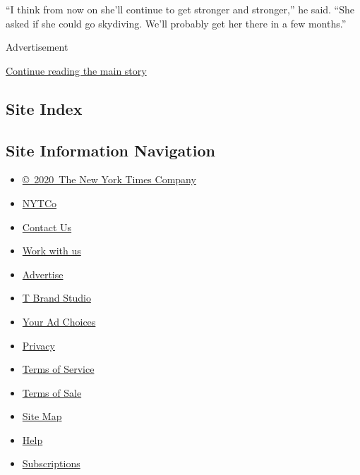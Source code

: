 ``I think from now on she'll continue to get stronger and stronger,'' he
said. ``She asked if she could go skydiving. We'll probably get her
there in a few months.''

Advertisement

\protect\hyperlink{after-bottom}{Continue reading the main story}

\hypertarget{site-index}{%
\subsection{Site Index}\label{site-index}}

\hypertarget{site-information-navigation}{%
\subsection{Site Information
Navigation}\label{site-information-navigation}}

\begin{itemize}
\tightlist
\item
  \href{https://help.nytimes3xbfgragh.onion/hc/en-us/articles/115014792127-Copyright-notice}{©~2020~The
  New York Times Company}
\end{itemize}

\begin{itemize}
\tightlist
\item
  \href{https://www.nytco.com/}{NYTCo}
\item
  \href{https://help.nytimes3xbfgragh.onion/hc/en-us/articles/115015385887-Contact-Us}{Contact
  Us}
\item
  \href{https://www.nytco.com/careers/}{Work with us}
\item
  \href{https://nytmediakit.com/}{Advertise}
\item
  \href{http://www.tbrandstudio.com/}{T Brand Studio}
\item
  \href{https://www.nytimes3xbfgragh.onion/privacy/cookie-policy\#how-do-i-manage-trackers}{Your
  Ad Choices}
\item
  \href{https://www.nytimes3xbfgragh.onion/privacy}{Privacy}
\item
  \href{https://help.nytimes3xbfgragh.onion/hc/en-us/articles/115014893428-Terms-of-service}{Terms
  of Service}
\item
  \href{https://help.nytimes3xbfgragh.onion/hc/en-us/articles/115014893968-Terms-of-sale}{Terms
  of Sale}
\item
  \href{https://spiderbites.nytimes3xbfgragh.onion}{Site Map}
\item
  \href{https://help.nytimes3xbfgragh.onion/hc/en-us}{Help}
\item
  \href{https://www.nytimes3xbfgragh.onion/subscription?campaignId=37WXW}{Subscriptions}
\end{itemize}
